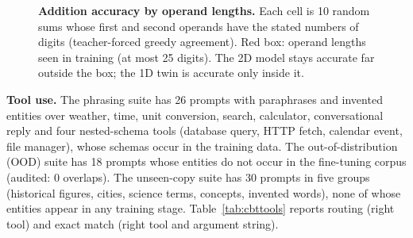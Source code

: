 \documentclass[10pt,twocolumn]{article}
\begin{document}
\begin{figure}[t]
\caption{\textbf{Addition accuracy by operand lengths.} Each cell is 10 random sums whose first and second operands have the stated numbers of digits (teacher-forced greedy agreement). Red box: operand lengths seen in training (at most 25 digits). The 2D model stays accurate far outside the box; the 1D twin is accurate only inside it.}\label{fig:grid}
\end{figure}

\textbf{Tool use.} The phrasing suite has 26 prompts with paraphrases and invented entities over weather, time, unit conversion, search, calculator, conversational reply and four nested-schema tools (database query, HTTP fetch, calendar event, file manager), whose schemas occur in the training data. The out-of-distribution (OOD) suite has 18 prompts whose entities do not occur in the fine-tuning corpus (audited: 0 overlaps). The unseen-copy suite has 30 prompts in five groups (historical figures, cities, science terms, concepts, invented words), none of whose entities appear in any training stage. Table~\ref{tab:cbttools} reports routing (right tool) and exact match (right tool and argument string).
\end{document}
